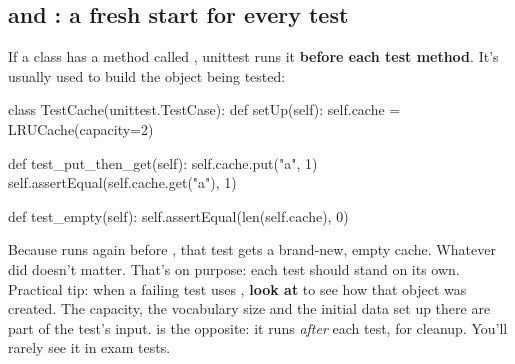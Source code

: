 \documentclass[10pt,a4paper]{article}
\begin{document}
\subsection{ and : a fresh start for every test}
If a class has a method called , unittest runs it \textbf{before each test method}. It’s usually used to build the object being tested:
\begin{pycode}
class TestCache(unittest.TestCase):
    def setUp(self):
        self.cache = LRUCache(capacity=2)

    def test_put_then_get(self):
        self.cache.put("a", 1)
        self.assertEqual(self.cache.get("a"), 1)

    def test_empty(self):
        self.assertEqual(len(self.cache), 0)
\end{pycode}
Because  runs again before , that test gets a brand-new, empty cache. Whatever  did doesn’t matter. That’s on purpose: each test should stand on its own.
Practical tip: when a failing test uses , \textbf{look at } to see how that object was created. The capacity, the vocabulary size and the initial data set up there are part of the test’s input.
 is the opposite: it runs \emph{after} each test, for cleanup. You’ll rarely see it in exam tests.
\end{document}
